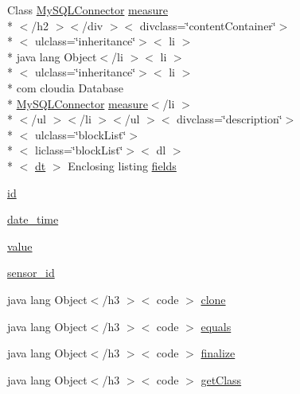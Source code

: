 \begin{DoxyCompactItemize}
 Class \hyperlink{index-11_8html_a322cd5a4b8e45fdf3e36cc69d22c1637}{My\-S\-Q\-L\-Connector} \hyperlink{index-11_8html_acafc813e7e06597a079f86f5cdd7d5f9}{measure}\\*
$<$/h2 $>$$<$/div $>$$<$ divclass=\char`\"{}content\-Container\char`\"{}$>$\\*
$<$ ulclass=\char`\"{}inheritance\char`\"{}$>$$<$ li $>$\\*
 java lang Object$<$/li $>$$<$ li $>$\\*
$<$ ulclass=\char`\"{}inheritance\char`\"{}$>$$<$ li $>$\\*
 com cloudia Database \\*
\hyperlink{index-11_8html_a322cd5a4b8e45fdf3e36cc69d22c1637}{My\-S\-Q\-L\-Connector} \hyperlink{index-11_8html_acafc813e7e06597a079f86f5cdd7d5f9}{measure}$<$/li $>$\\*
$<$/ul $>$$<$/li $>$$<$/ul $>$$<$ divclass=\char`\"{}description\char`\"{}$>$\\*
$<$ ulclass=\char`\"{}block\-List\char`\"{}$>$\\*
$<$ liclass=\char`\"{}block\-List\char`\"{}$>$$<$ dl $>$\\*
$<$ \hyperlink{stylesheet_8css_a107565fb4039d33b041380d6e0ea1d80}{dt} $>$ Enclosing listing \hyperlink{_my_s_q_l_connector_8measure_8html_a9bdc67ab8910b38c5b46b9530b9efac9}{fields}
\item 
\hyperlink{_my_s_q_l_connector_8measure_8html_acf2488b95c97e0378c9bf49de3b50f28}{id}
\item 
\hyperlink{_my_s_q_l_connector_8measure_8html_a2ebe356a2a4f9bab3a6c50f65ccc86d5}{date\-\_\-time}
\item 
\hyperlink{_my_s_q_l_connector_8measure_8html_afcc7a4b78ecd8fa7e713f8cfa0f51017}{value}
\item 
\hyperlink{_my_s_q_l_connector_8measure_8html_a48a4081a48bf69abc4ba5d704ec33919}{sensor\-\_\-id}
\item 
java lang Object$<$/h3 $>$$<$ code $>$ \hyperlink{_my_s_q_l_connector_8measure_8html_adc9607fcabf6f2d7f401ad52015ef6e0}{clone}
\item 
java lang Object$<$/h3 $>$$<$ code $>$ \hyperlink{_my_s_q_l_connector_8measure_8html_a8974318cea585f72df717e0380ec7104}{equals}
\item 
java lang Object$<$/h3 $>$$<$ code $>$ \hyperlink{_my_s_q_l_connector_8measure_8html_ab2315181ead4aeedef2374039b6ddde7}{finalize}
\item 
java lang Object$<$/h3 $>$$<$ code $>$ \hyperlink{_my_s_q_l_connector_8measure_8html_a98e6644727fe65eac217a6855045be43}{get\-Class}
$$
\end{DoxyCompactItemize}
